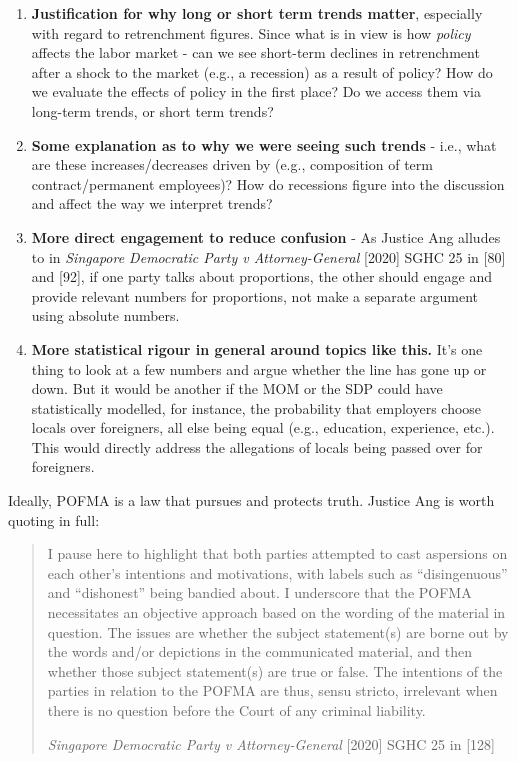 \documentclass[openany]{book}
\providecommand{\tightlist}{%
  \setlength{\itemsep}{0pt}\setlength{\parskip}{0pt}}
\begin{document}
\begin{enumerate}
\def\labelenumi{\arabic{enumi}.}
\tightlist
\item
  \textbf{Justification for why long or short term trends matter},
  especially with regard to retrenchment figures. Since what is in view
  is how \emph{policy} affects the labor market - can we see short-term
  declines in retrenchment after a shock to the market (e.g., a
  recession) as a result of policy? How do we evaluate the effects of
  policy in the first place? Do we access them via long-term trends, or
  short term trends?
\item
  \textbf{Some explanation as to why we were seeing such trends} - i.e.,
  what are these increases/decreases driven by (e.g., composition of
  term contract/permanent employees)? How do recessions figure into the
  discussion and affect the way we interpret trends?
\item
  \textbf{More direct engagement to reduce confusion} - As Justice Ang
  alludes to in \emph{Singapore Democratic Party v Attorney-General}
  {[}2020{]} SGHC 25 in {[}80{]} and {[}92{]}, if one party talks about
  proportions, the other should engage and provide relevant numbers for
  proportions, not make a separate argument using absolute numbers.
\item
  \textbf{More statistical rigour in general around topics like this.}
  It's one thing to look at a few numbers and argue whether the line has
  gone up or down. But it would be another if the MOM or the SDP could
  have statistically modelled, for instance, the probability that
  employers choose locals over foreigners, all else being equal (e.g.,
  education, experience, etc.). This would directly address the
  allegations of locals being passed over for foreigners.
\end{enumerate}

Ideally, POFMA is a law that pursues and protects truth. Justice Ang is
worth quoting in full:

\begin{quote}
I pause here to highlight that both parties attempted to cast aspersions
on each other's intentions and motivations, with labels such as
``disingenuous'' and ``dishonest'' being bandied about. I underscore
that the POFMA necessitates an objective approach based on the wording
of the material in question. The issues are whether the subject
statement(s) are borne out by the words and/or depictions in the
communicated material, and then whether those subject statement(s) are
true or false. The intentions of the parties in relation to the POFMA
are thus, sensu stricto, irrelevant when there is no question before the
Court of any criminal liability.

\emph{Singapore Democratic Party v Attorney-General} {[}2020{]} SGHC 25
in {[}128{]}
\end{quote}
\end{document}
